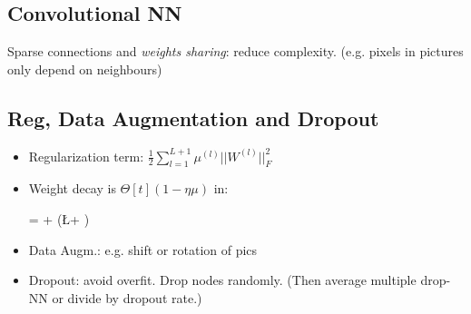  
\subsection{Convolutional NN} 

Sparse connections and \textit{weights sharing}: reduce complexity. (e.g. pixels in pictures only depend on neighbours)

 
\subsection{Reg, Data Augmentation and Dropout}

\begin{itemize}
	\item Regularization term: $\frac{1}{2} \sum_{l=1}^{L+1} \mu^{(l)} || W ^{(l)} ||  ^{2} _{F}$
	\item Weight decay is $\Theta[t](1-\eta \mu)$ in:
	\begin{myalign*}
	\Theta[t+1] = \Theta[t] + \eta (\nabla \L + \mu \Theta[t])
	\end{myalign*}
	\item Data Augm.: e.g. shift or rotation of pics
	\item Dropout: avoid overfit. Drop nodes randomly. (Then average multiple drop-NN or divide by dropout rate.)
\end{itemize}


